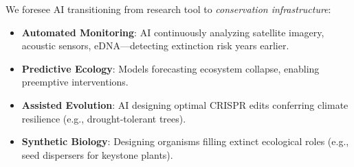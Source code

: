 We foresee AI transitioning from research tool to \textit{conservation infrastructure}:

\begin{itemize}
    \item \textbf{Automated Monitoring}: AI continuously analyzing satellite imagery, acoustic sensors, eDNA—detecting extinction risk years earlier.
    \item \textbf{Predictive Ecology}: Models forecasting ecosystem collapse, enabling preemptive interventions.
    \item \textbf{Assisted Evolution}: AI designing optimal CRISPR edits conferring climate resilience (e.g., drought-tolerant trees).
    \item \textbf{Synthetic Biology}: Designing organisms filling extinct ecological roles (e.g., seed dispersers for keystone plants).
\end{itemize}

